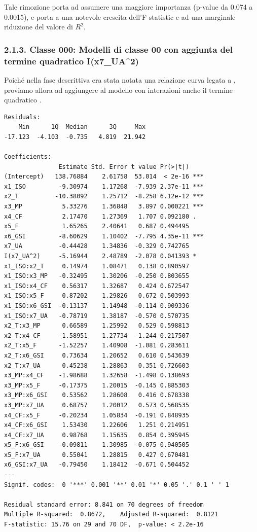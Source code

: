 Tale rimozione porta \texttt{} ad assumere una maggiore importanza (p-value da 0.074 a 0.0015), e porta a una notevole crescita dell'F-statistic e ad una marginale riduzione del valore di $R^2$.

\subsubsection{2.1.3. Classe 000: Modelli di classe 00 con aggiunta del termine quadratico I(x7\_UA\textasciicircum{}2)}
\label{sec:213-classe-000-modelli-di-classe-00-con-aggiunta-del-termine-quadratico-ix7ua2}

Poiché nella fase descrittiva era stata notata una relazione curva legata a \texttt{}, proviamo allora ad aggiungere al modello con interazioni anche il termine quadratico \texttt{}.

\begin{lstlisting}[style=rconsole,caption={fit000}]
Residuals:
    Min      1Q  Median      3Q     Max
-17.123  -4.103  -0.735   4.819  21.942

Coefficients:
               Estimate Std. Error t value Pr(>|t|)
(Intercept)   138.76884    2.61758  53.014  < 2e-16 ***
x1_ISO         -9.30974    1.17268  -7.939 2.37e-11 ***
x2_T          -10.38092    1.25712  -8.258 6.12e-12 ***
x3_MP           5.33276    1.36848   3.897 0.000221 ***
x4_CF           2.17470    1.27369   1.707 0.092180 .
x5_F            1.65265    2.40641   0.687 0.494495
x6_GSI         -8.60629    1.10402  -7.795 4.35e-11 ***
x7_UA          -0.44428    1.34836  -0.329 0.742765
I(x7_UA^2)     -5.16944    2.48789  -2.078 0.041393 *
x1_ISO:x2_T     0.14974    1.08471   0.138 0.890597
x1_ISO:x3_MP   -0.32495    1.30206  -0.250 0.803655
x1_ISO:x4_CF    0.56317    1.32687   0.424 0.672547
x1_ISO:x5_F     0.87202    1.29826   0.672 0.503993
x1_ISO:x6_GSI  -0.13137    1.14948  -0.114 0.909336
x1_ISO:x7_UA   -0.78719    1.38187  -0.570 0.570735
x2_T:x3_MP      0.66589    1.25992   0.529 0.598813
x2_T:x4_CF     -1.58951    1.27734  -1.244 0.217507
x2_T:x5_F      -1.52257    1.40908  -1.081 0.283611
x2_T:x6_GSI     0.73634    1.20652   0.610 0.543639
x2_T:x7_UA      0.45238    1.28863   0.351 0.726603
x3_MP:x4_CF    -1.98688    1.32658  -1.498 0.138693
x3_MP:x5_F     -0.17375    1.20015  -0.145 0.885303
x3_MP:x6_GSI    0.53562    1.28608   0.416 0.678338
x3_MP:x7_UA     0.68757    1.20012   0.573 0.568535
x4_CF:x5_F     -0.20234    1.05834  -0.191 0.848935
x4_CF:x6_GSI    1.53430    1.22606   1.251 0.214951
x4_CF:x7_UA     0.98768    1.15635   0.854 0.395945
x5_F:x6_GSI    -0.09811    1.30985  -0.075 0.940505
x5_F:x7_UA      0.55041    1.28815   0.427 0.670481
x6_GSI:x7_UA   -0.79450    1.18412  -0.671 0.504452
---
Signif. codes:  0 '***' 0.001 '**' 0.01 '*' 0.05 '.' 0.1 ' ' 1

Residual standard error: 8.841 on 70 degrees of freedom
Multiple R-squared:  0.8672,    Adjusted R-squared:  0.8121
F-statistic: 15.76 on 29 and 70 DF,  p-value: < 2.2e-16
\end{lstlisting}

